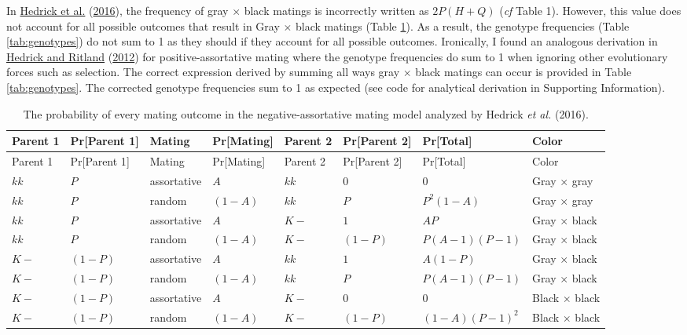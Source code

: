 \documentclass[
]{article}
\begin{document}
In \protect\hyperlink{ref-hedrick_negative-assortative_2016}{Hedrick et al.} (\protect\hyperlink{ref-hedrick_negative-assortative_2016}{2016}), the frequency of gray \(\times\) black matings is incorrectly written as \(2 P (H + Q)\) (\emph{cf} Table 1). However, this value does not account for all possible outcomes that result in Gray \(\times\) black matings (Table \ref{tab:probabilities}). As a result, the genotype frequencies (Table \ref{tab:genotypes}) do not sum to 1 as they should if they account for all possible outcomes. Ironically, I found an analogous derivation in \protect\hyperlink{ref-hedrick_population_2012}{Hedrick and Ritland} (\protect\hyperlink{ref-hedrick_population_2012}{2012}) for positive-assortative mating where the genotype frequencies do sum to 1 when ignoring other evolutionary forces such as selection. The correct expression derived by summing all ways gray \(\times\) black matings can occur is provided in Table \ref{tab:genotypes}. The corrected genotype frequencies sum to 1 as expected (see code for analytical derivation in Supporting Information).

\begin{longtable}[]{@{}llllllll@{}}
\caption{\label{tab:probabilities}The probability of every mating outcome in the negative-assortative mating model analyzed by Hedrick \emph{et al.} (2016).}\tabularnewline
\toprule
Parent 1 & Pr{[}Parent 1{]} & Mating & Pr{[}Mating{]} & Parent 2 & Pr{[}Parent 2{]} & Pr{[}Total{]} & Color \\
\midrule
\endfirsthead
\toprule
Parent 1 & Pr{[}Parent 1{]} & Mating & Pr{[}Mating{]} & Parent 2 & Pr{[}Parent 2{]} & Pr{[}Total{]} & Color \\
\midrule
\endhead
\(kk\) & \(P\) & assortative & \(A\) & \(kk\) & \(0\) & \(0\) & Gray \(\times\) gray \\
\(kk\) & \(P\) & random & \((1 - A)\) & \(kk\) & \(P\) & \(P ^ 2 (1 - A)\) & Gray \(\times\) gray \\
\(kk\) & \(P\) & assortative & \(A\) & \(K-\) & \(1\) & \(A P\) & Gray \(\times\) black \\
\(kk\) & \(P\) & random & \((1 - A)\) & \(K-\) & \((1 - P)\) & \(P (A - 1) (P - 1)\) & Gray \(\times\) black \\
\(K-\) & \((1 - P)\) & assortative & \(A\) & \(kk\) & \(1\) & \(A (1 - P)\) & Gray \(\times\) black \\
\(K-\) & \((1 - P)\) & random & \((1 - A)\) & \(kk\) & \(P\) & \(P (A - 1) (P - 1)\) & Gray \(\times\) black \\
\(K-\) & \((1 - P)\) & assortative & \(A\) & \(K-\) & \(0\) & \(0\) & Black \(\times\) black \\
\(K-\) & \((1 - P)\) & random & \((1 - A)\) & \(K-\) & \((1 - P)\) & \((1 - A) (P - 1) ^ 2\) & Black \(\times\) black \\
\bottomrule
\end{longtable}
\end{document}
